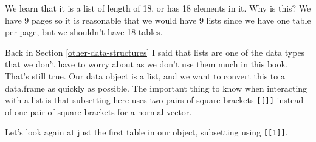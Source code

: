 \documentclass[
  a4paper,
]{krantz}
\begin{document}
We learn that it is a list of length of 18, or has 18
elements in it. Why is this? We have 9 pages so it is
reasonable that we would have 9 lists since we have one
table per page, but we shouldn't have 18 tables.

Back in Section \ref{other-data-structures} I said that
lists are one of the data types that we don't have to worry
about as we don't use them much in this book. That's still
true. Our data object is a list, and we want to convert this
to a data.frame as quickly as possible. The important thing
to know when interacting with a list is that subsetting here
uses two pairs of square brackets \texttt{{[}{[}{]}{]}}
instead of one pair of square brackets for a normal vector.

Let's look again at just the first table in our object,
subsetting using \texttt{{[}{[}1{]}{]}}.
\end{document}
